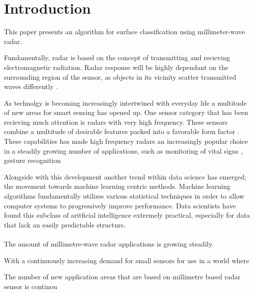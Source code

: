 \documentclass[a4paper, 12pt]{article}
\begin{document}
\section{Introduction}

This paper presents an algorithm for surface classification using millimeter-wave radar. 

Fundamentally, radar is based on the concept of transmitting and recieving electromagnetic radiation. Radar response will be highly dependant on the surrounding region of the sensor, as objects in its vicinity scatter transmitted waves differently \citep{richards_2014}.  

 As technolgy is becoming increasingly intertwined with everyday life a multitude of new areas for smart sensing has opened up. One sensor category that has been recieving much attention is radars with very high frequency. These sensors combine a multitude of desirable features packed into a favorable form factor . These capabilities has made high frequency radars an increasingly popular choice in a steadily growing number of applications, such as monitoring of vital signs \citep{kuo_lin_yu_lo_lyu_chou_chuang_2016}, gesture recognition \citep{lien_gillian_karagozler_amihood_schwesig_olson_raja_poupyrev_2016}

Alongside with this development another trend within data science has emerged; the movement towards machine learning centric methods. Machine learning algorithms fundamentally utilizes various statistical techniques in order to allow computer systems to progressively improve performance. Data scientists have found this subclass of aritficial intelligence extremely practical, especially for data that lack an easily predictable structure. 
\\ \\
The amount of millimetre-wave radar applications is growing steadily.

With a continuously increasing demand for small sensors for use in a world where 

The number of new application areas that are based on millimetre based radar sensor is continou
\end{document}
